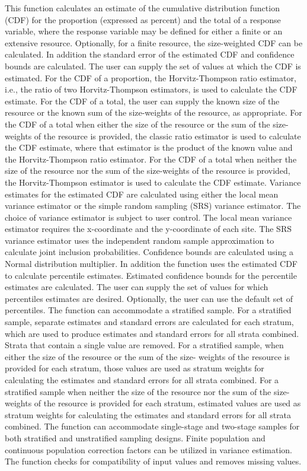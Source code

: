 \begin{Details}\relax
This function calculates an estimate of the cumulative distribution function
(CDF) for the proportion (expressed as percent) and the total of a
response  variable, where the response variable may be defined for either a
finite or an extensive resource.  Optionally, for a finite resource, the
size-weighted CDF can be calculated.  In addition the standard error of
the estimated CDF and confidence bounds are calculated.  The user
can supply the set of values at which the CDF is estimated.  For the 
CDF of a proportion, the Horvitz-Thompson ratio estimator, i.e., the
ratio of two Horvitz-Thompson estimators, is used to calculate the CDF
estimate.  For the CDF of a total, the user can supply the known size of
the resource or the known sum of the size-weights of the resource, as
appropriate.  For the CDF of a total when either the size of the
resource or the sum of the size-weights of the resource is provided, the
classic ratio estimator is used to calculate the CDF estimate, where
that estimator is the product of the known value and the Horvitz-Thompson ratio
estimator.   For the CDF of a total when neither the size of the
resource nor the sum of the size-weights of the resource is provided, the
Horvitz-Thompson estimator is used to calculate the CDF estimate.
Variance estimates for the estimated CDF are calculated using either the
local mean variance estimator or the simple random sampling (SRS) 
variance estimator.  The choice of variance estimator is subject to user 
control. The local mean variance estimator requires the x-coordinate and
the y-coordinate of each site.  The SRS variance estimator uses
the independent random sample approximation to calculate joint inclusion
probabilities.  Confidence bounds are calculated using a Normal
distribution multiplier.  In addition the function uses the estimated 
CDF to calculate percentile estimates.  Estimated confidence bounds for
the percentile estimates are calculated.  The user can supply the set of values
for which percentiles estimates are desired.  Optionally, the user can use the
default set of percentiles.  The function can accommodate a stratified sample.
For a stratified sample, separate estimates and standard errors are calculated
for each stratum, which are used to produce estimates and standard errors for
all strata combined.  Strata that contain a single value are removed.  For a
stratified sample, when either the size of the resource or the sum of the size-
weights of the resource is provided for each stratum, those values are used as 
stratum weights for calculating the estimates and standard  errors for all 
strata combined.  For a stratified sample when neither the size of the resource
nor the sum of the size-weights of the resource is provided for each stratum, 
estimated values are used as stratum weights for calculating the estimates and 
standard errors for all strata combined.   The function can accommodate 
single-stage and two-stage samples for both stratified and unstratified 
sampling designs.  Finite population and continuous population correction 
factors can be utilized in variance estimation.  The function checks for 
compatibility of input values and removes missing values.
\end{Details}
